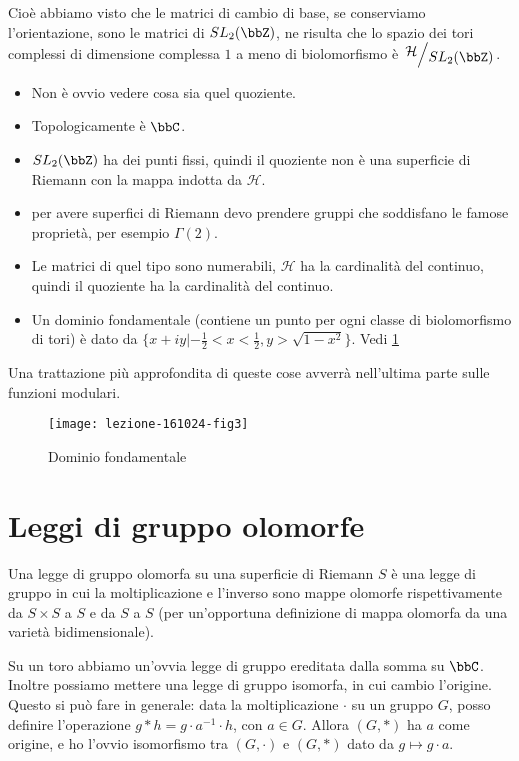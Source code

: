 Cioè abbiamo visto che le matrici di cambio di base, se conserviamo l'orientazione, sono le matrici di $SL_2(\bbZ)$, ne risulta che lo spazio dei tori complessi di dimensione complessa $1$ a meno di biolomorfismo è $\quotient{\mathcal{H}}{SL_2(\bbZ)}$.

\begin{osservazione}
\begin{itemize}
\item Non è ovvio vedere cosa sia quel quoziente.
\item Topologicamente è $\bbC$.
\item $SL_2(\bbZ)$ ha dei punti fissi, quindi il quoziente non è una superficie di Riemann con la mappa indotta da $\mathcal{H}$.
\item per avere superfici di Riemann devo prendere gruppi che soddisfano le famose proprietà, per esempio $\Gamma (2)$.
\item Le matrici di quel tipo sono numerabili, $\mathcal H$ ha la cardinalità del continuo, quindi il quoziente ha la cardinalità del continuo.
\item Un dominio fondamentale (contiene un punto per ogni classe di biolomorfismo di tori) è dato da $\{ x+iy | -\frac{1}{2}<x<\frac{1}{2}, y>\sqrt{1-x^2}\}$. Vedi \ref{fig:2}
\end{itemize}
\end{osservazione}
Una trattazione più approfondita di queste cose avverrà nell'ultima parte sulle funzioni modulari.


\begin{figure}[h]
\texttt{[image: lezione-161024-fig3]}
\caption{Dominio fondamentale}\label{fig:2}
\end{figure}

\chapter{Leggi di gruppo olomorfe}

\begin{definizione}
Una legge di gruppo olomorfa su una superficie di Riemann $S$ è una legge di gruppo in cui la moltiplicazione e l'inverso sono mappe olomorfe rispettivamente da $S \times S$ a $S$ e da $S$ a $S$ (per un'opportuna definizione di mappa olomorfa da una varietà bidimensionale).
\end{definizione}

Su un toro abbiamo un'ovvia legge di gruppo ereditata dalla somma su $\bbC$. Inoltre possiamo mettere una legge di gruppo isomorfa, in cui cambio l'origine. Questo si può fare in generale: data la moltiplicazione $\cdot$ su un gruppo $G$, posso definire l'operazione $g * h = g\cdot a^{-1}\cdot h$, con $a\in G$. Allora $(G,*)$ ha $a$ come origine, e ho l'ovvio isomorfismo tra $(G,\cdot)$ e $(G,*)$ dato da $g\mapsto g\cdot a$.

